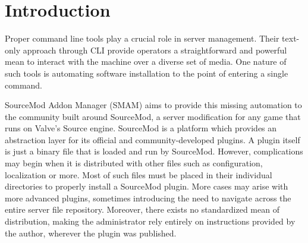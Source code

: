 \chapter{Introduction}

Proper command line tools play a crucial role in server management.
Their text-only approach through CLI provide operators a straightforward and powerful mean to interact with the machine over a diverse set of media.
One nature of such tools is automating software installation to the point of entering a single command.

SourceMod Addon Manager (SMAM) aims to provide this missing automation to the community built around SourceMod, a server modification for any game that runs on Valve's Source engine.
SourceMod is a platform which provides an abstraction layer for its official and community-developed plugins.
A plugin itself is just a binary file that is loaded and run by SourceMod.
However, complications may begin when it is distributed with other files such as configuration, localization or more.
Most of such files must be placed in their individual directories to properly install a SourceMod plugin.
More cases may arise with more advanced plugins, sometimes introducing the need to navigate across the entire server file repository.
Moreover, there exists no standardized mean of distribution, making the administrator rely entirely on instructions provided by the author, wherever the plugin was published.
